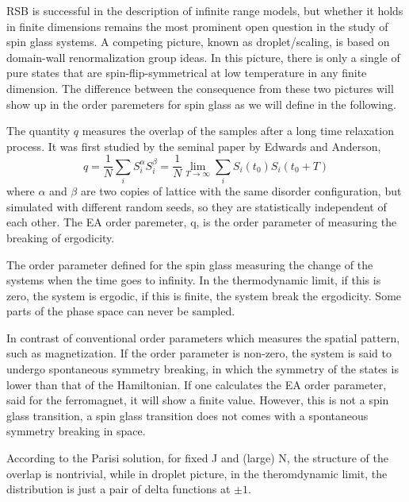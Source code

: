 RSB is successful in the description of infinite range models, but whether it 
holds in finite dimensions remains the most prominent open question in the study of spin glass systems. 
A competing picture, known as droplet/scaling, is based on domain-wall 
renormalization group ideas. In this picture, there is only a single of
pure states that are spin-flip-symmetrical at low temperature in any finite 
dimension. The difference between the consequence from these two pictures 
will show up in the order paremeters for spin glass as we will define in the following.


The quantity $q$ measures the overlap of the samples after a long time relaxation process. 
It was first studied by the seminal paper by Edwards and Anderson,
\begin{equation}
  \label{eq:q}
  q=\frac{1}{N}\sum_iS_i^\alpha S_i^\beta=\frac{1}{N}\lim_{T\to \infty}\sum_iS_i(t_0)S_i(t_0+T)
\end{equation}
where $\alpha$ and $\beta$ are two copies of lattice with the same disorder 
configuration, but simulated with different random seeds, so they are
statistically independent of each other. The EA order paremeter, q, 
is the order parameter of measuring the breaking of ergodicity. 

The order parameter defined for the spin glass measuring the change of the systems
when the time goes to infinity. In the thermodynamic limit, if this
is zero, the system is ergodic, if this is finite, the system break
the ergodicity. Some parts of the phase space can never be sampled.

In contrast of conventional order parameters which measures the 
spatial pattern, such as magnetization. If the order parameter is non-zero, 
the system is said to undergo spontaneous symmetry breaking, in which the symmetry of 
the states is lower than that of the Hamiltonian. If one calculates
the EA order parameter, said for the ferromagnet, it will
show a finite value. However, this is not a spin glass transition, a
spin glass transition does not comes with a spontaneous symmetry breaking in space.

According to the Parisi solution, for fixed J and (large) N, the structure of 
the overlap is nontrivial, while in droplet picture, in the theromdynamic limit, the distribution is just 
a pair of delta functions at $\pm 1$. 

